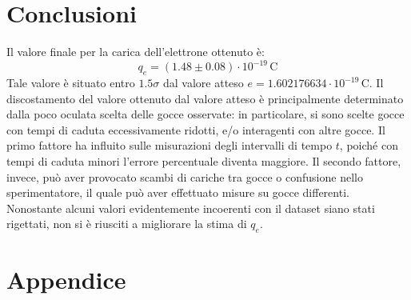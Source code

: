 \documentclass[]{article}
\let\oldsection\section%
\renewcommand{\section}{%
	\renewcommand{\theequation}{\thesection.\arabic{equation}}%
	\oldsection}%
\begin{document}
    \section{Conclusioni}
    Il valore finale per la carica dell'elettrone ottenuto è:
    \begin{equation}
        q_e = \left( 1.48 \pm 0.08 \right) \cdot 10^{-19} \, \text{C}
    \end{equation}
    Tale valore è situato entro $1.5\sigma$ dal valore atteso $e = 1.602176634 \cdot 10^{-19} \, \text{C}$. Il discostamento del valore ottenuto dal valore atteso è principalmente determinato dalla poco oculata scelta delle gocce osservate: in particolare, si sono scelte gocce con tempi di caduta eccessivamente ridotti, e/o interagenti con altre gocce. Il primo fattore ha influito sulle misurazioni degli intervalli di tempo $t$, poiché con tempi di caduta minori l'errore percentuale diventa maggiore. Il secondo fattore, invece, può aver provocato scambi di cariche tra gocce o confusione nello sperimentatore, il quale può aver effettuato misure su gocce differenti. \\
    Nonostante alcuni valori evidentemente incoerenti con il dataset siano stati rigettati, non si è riusciti a migliorare la stima di $q_e$.
    
    \newpage

    \section*{Appendice}
\end{document}
